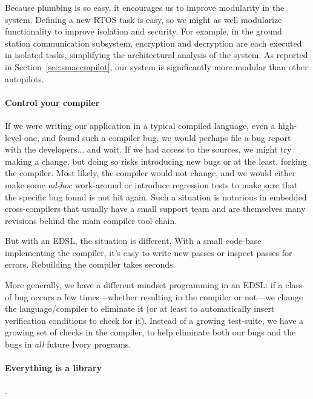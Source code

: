 Because plumbing is so easy, it encourages us to improve modularity in the
system.  Defining a new RTOS task is easy, so we might as well modularize
functionality to improve isolation and security.  For example, in the ground
station communication subsystem, encryption and decryption are each executed in
isolated tasks, simplifying the architectural analysis of the system.  As
reported in Section~\ref{sec:smaccmpilot}, our system is significantly more
modular than other autopilots.

\paragraph{Control your compiler}
If we were writing our application in a typical compiled language, even a
high-level one, and found such a compiler bug, we would perhaps file a bug
report with the developers... and wait.  If we had access to the sources, we
might try making a change, but doing so risks introducing new bugs or at the
least, forking the compiler.  Most likely, the compiler would not change, and we
would either make some \emph{ad-hoc} work-around or introduce regression tests
to make sure that the specific bug found is not hit again.  Such a situation is
notorious in embedded cross-compilers that usually have a small support team and
are themselves many revisions behind the main compiler tool-chain.

But with an EDSL, the situation is different.  With a small code-base
implementing the compiler, it’s easy to write new passes or inspect passes for
errors.  Rebuilding the compiler takes seconds.

More generally, we have a different mindset programming in an EDSL: if a class
of bug occurs a few times---whether resulting in the compiler or not---we change
the language/compiler to eliminate it (or at least to automatically insert
verification conditions to check for it).  Instead of a growing test-suite, we
have a growing set of checks in the compiler, to help eliminate both our bugs
and the bugs in \emph{all} future Ivory programs.

\paragraph{Everything is a library}.

